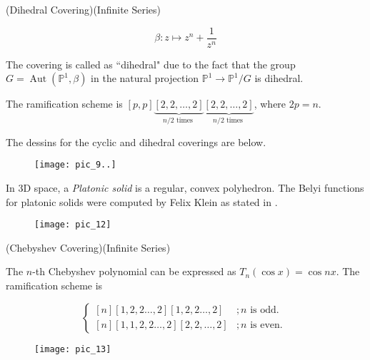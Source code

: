 \begin{example} (Dihedral Covering)(Infinite Series)

$$
\beta: z \mapsto z^{n}+\frac{1}{z^{n}}
$$

The covering is called as ``dihedral" due to the fact that the group $G=\operatorname{Aut}\left(\mathbb{P}^{1}, \beta\right)$ in the natural projection $\mathbb{P}^{1} \rightarrow \mathbb{P}^{1} / G$ is dihedral.

The ramification scheme is $[p, p] \underbrace{[2,2, \ldots, 2]}_{n / 2 \text { times }} \underbrace{[2,2, \ldots, 2]}_{n / 2 \text { times }}$, where $2 p=n$.

\end{example}

The dessins for the cyclic and dihedral coverings are below.
\begin{figure}[htp]
\texttt{[image: pic\_9..]}
\end{figure}


\begin{example}
    In 3D space, a \textit{Platonic solid} is a regular, convex polyhedron. The Belyi functions for platonic solids were computed by Felix Klein as stated in \cite{Klein}. 


\begin{figure}[htp]
\texttt{[image: pic\_12]}
\end{figure}

\end{example}
\vskip1pt
\begin{example}
     (Chebyshev Covering)(Infinite Series)

The $n$-th Chebyshev polynomial can be expressed as $T_{n}(\cos x)=\cos n x$. The ramification scheme is

$$
\begin{cases}{[n][1,2,2 \ldots, 2][1,2,2 \ldots, 2]} & ; n \text { is odd. } \\ {[n][1,1,2,2 \ldots, 2][2,2, \ldots, 2]} & ; n \text { is even. }\end{cases}
$$

\begin{figure}[htp]
\texttt{[image: pic\_13]}
\end{figure}

\end{example}



